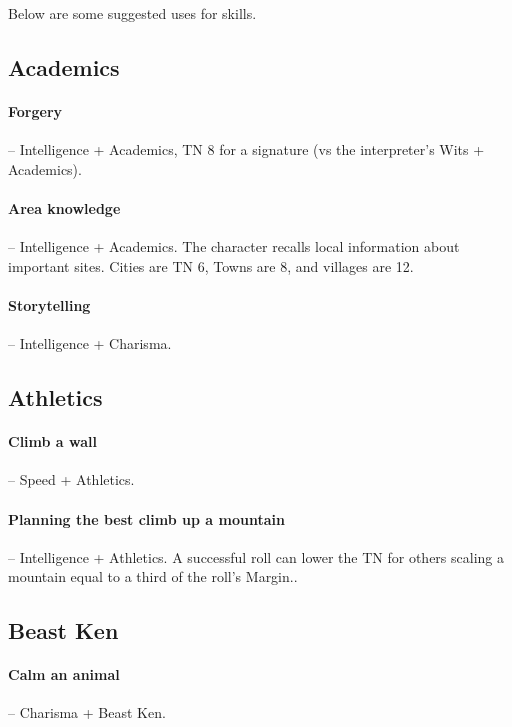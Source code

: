 \begin{multicols}{2}

\noindent
Below are some suggested uses for skills.

\subsection{Academics}

\paragraph{Forgery} -- Intelligence + Academics, TN 8 for a signature (vs the interpreter's Wits + Academics).

\paragraph{Area knowledge } -- Intelligence + Academics.
The character recalls local information about important sites.
Cities are TN 6, Towns are 8, and villages are 12.

\paragraph{Storytelling} -- Intelligence + Charisma.

\subsection{Athletics}

\paragraph{Climb a wall} -- Speed + Athletics.

\paragraph{Planning the best climb up a mountain} -- Intelligence + Athletics.
A successful roll can lower the TN for others scaling a mountain equal to a third of the roll's Margin..

\subsection{Beast Ken}

\paragraph{Calm an animal} -- Charisma + Beast Ken.


\end{multicols}
